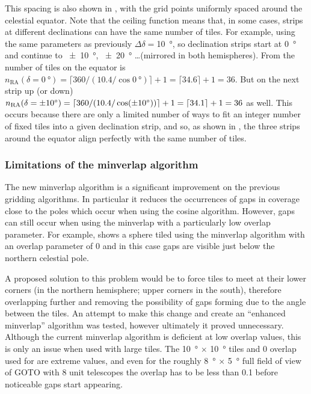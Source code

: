 \begin{colsection}
This spacing is also shown in , with the grid points uniformly spaced around the celestial equator. Note that the ceiling function means that, in some cases, strips at different declinations can have the same number of tiles. For example, using the same parameters as previously $\Delta\delta=$\SI{10}{\degree}, so declination strips start at \SI{0}{\degree} and continue to \SI{\pm10}{\degree}, \SI{\pm20}{\degree} \ldots (mirrored in both hemispheres). From  the number of tiles on the equator is $n_\text{RA}(\delta=\SI{0}{\degree}) = \lceil 360/(10.4/\cos \SI{0}{\degree}) \rceil + 1 = \lceil 34.6 \rceil + 1 = 36$. But on the next strip up (or down) $n_\text{RA}(\delta=\SI{\pm10}{\degree}) = \lceil 360/(10.4/\cos(\pm\SI{10}{\degree})) \rceil + 1 = \lceil 34.1 \rceil + 1 = 36$ as well. This occurs because there are only a limited number of ways to fit an integer number of fixed tiles into a given declination strip, and so, as shown in , the three strips around the equator align perfectly with the same number of tiles.

\subsubsection{Limitations of the minverlap algorithm}

The new minverlap algorithm is a significant improvement on the previous gridding algorithms. In particular it reduces the occurrences of gaps in coverage close to the poles which occur when using the cosine algorithm. However, gaps can still occur when using the minverlap with a particularly low overlap parameter. For example,  shows a sphere tiled using the minverlap algorithm with an overlap parameter of 0 and in this case gaps are visible just below the northern celestial pole.

A proposed solution to this problem would be to force tiles to meet at their lower corners (in the northern hemisphere; upper corners in the south), therefore overlapping further and removing the possibility of gaps forming due to the angle between the tiles. An attempt to make this change and create an ``enhanced minverlap'' algorithm was tested, however ultimately it proved unnecessary. Although the current minverlap algorithm is deficient at low overlap values, this is only an issue when used with large tiles. The \SI{10}{\degree} $\times$ \SI{10}{\degree} tiles and 0 overlap used for  are extreme values, and even for the roughly \SI{8}{\degree} $\times$ \SI{5}{\degree} full field of view of GOTO with 8 unit telescopes the overlap has to be less than 0.1 before noticeable gaps start appearing.


\end{colsection}
